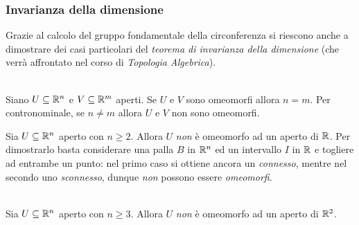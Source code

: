 \subsubsection{Invarianza della dimensione}
Grazie al calcolo del gruppo fondamentale della circonferenza si riescono anche a dimostrare dei casi particolari del \textit{teorema di invarianza della dimensione} (che verrà affrontato nel corso di \textit{Topologia Algebrica}).
\begin{theorema}~{}\\
Siano $U\subseteq\mathbb{R}^n$ e $V\subseteq \mathbb{R}^m$ aperti. Se $U$ e $V$ sono omeomorfi allora $n=m$. Per contronominale, se $n\neq m$ allora $U$ e $V$ non sono omeomorfi.
\end{theorema}
\begin{example}
	Sia $U\subseteq\mathbb{R}^n$ aperto con $n\geq 2$. Allora $U$ \textit{non} è omeomorfo ad un aperto di $\mathbb{R}$. Per dimostrarlo basta considerare una palla $B$ in $\mathbb{R}^n$ ed un intervallo $I$ in $\mathbb{R}$ e togliere ad entrambe un punto: nel primo caso si ottiene ancora un \textit{connesso}, mentre nel secondo uno \textit{sconnesso}, dunque \textit{non} possono essere \textit{omeomorfi}.
\end{example}
\begin{theorema}~{}\\\label{invarianzadimensionen=2}
	Sia $U\subseteq\mathbb{R}^n$ aperto con $n\geq 3$. Allora $U$ \textit{non} è omeomorfo ad un aperto di $\mathbb{R}^2$.
\end{theorema}
